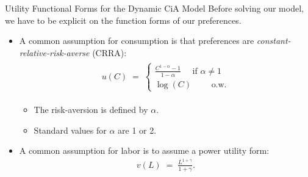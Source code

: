 \documentclass[10pt,c,aspectratio=1610,handout]{beamer}
\begin{document}
\begin{frame}{Utility Functional Forms for the Dynamic CiA Model}%
  Before solving our model, we have to be explicit on the function forms of our preferences.\\%
  \vspace*{0.2in}%
  \pause%
  \begin{itemize}%
    \item[$\blacktriangleright$] A common assumption for consumption is that preferences are \emph{constant-relative-risk-averse} (CRRA):%
    \begin{align}%
      \begin{split}%
        u(C) \; = \; \left\{%
        \begin{array}{c}%
          \frac{C^{1-\alpha }-1}{1-\alpha }\quad \text{ if }\alpha \neq 1 \\%
          \log(C) \quad \quad \text{ o.w.}%
        \end{array}%
        \right.%
      \end{split}%
    \end{align}%
    \begin{itemize}%
      \item[$\rightarrow$] The risk-aversion is defined by $\alpha$.%
      \item[$\rightarrow$] Standard values for $\alpha$ are 1 or 2.%
    \end{itemize}%
    \vspace*{0.2in}%
    \pause%
    \item[$\blacktriangleright$] A common assumption for labor is to assume a power utility form:%
    \begin{align}%
      v(L) \; = \; \frac{L^{1+\gamma}}{1+\gamma}.\label{labor preferences}%
    \end{align}%
  \end{itemize}%
\end{frame}%
\end{document}
